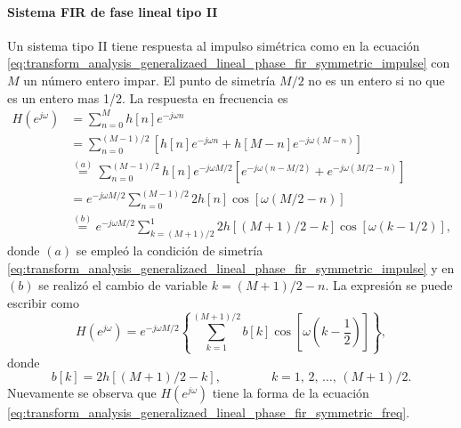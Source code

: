 \documentclass[a4paper]{report}
\begin{document}
\paragraph{Sistema FIR de fase lineal tipo II} Un sistema tipo II tiene respuesta al impulso simétrica como en la ecuación \ref{eq:transform_analysis_generalizaed_lineal_phase_fir_symmetric_impulse}
con \(M\) un número entero impar. El punto de simetría \(M/2\) no es un entero si no que es un entero mas 1/2. La respuesta en frecuencia es
\begin{align*}
 H(e^{j\omega})&=\sum_{n=0}^M h[n]e^{-j\omega n}\\
  &=\sum_{n=0}^{(M-1)/2}\left[h[n]e^{-j\omega n}+h[M-n]e^{-j\omega(M-n)}\right]\\
  &\overset{(a)}{=}\sum_{n=0}^{(M-1)/2}h[n]e^{-j\omega M/2}\left[e^{-j\omega(n-M/2)}+e^{-j\omega(M/2-n)}\right]\\
  &=e^{-j\omega M/2}\sum_{n=0}^{(M-1)/2}2h[n]\cos[\omega(M/2-n)]\\
  &\overset{(b)}{=}e^{-j\omega M/2}\sum_{k=(M+1)/2}^1 2h[(M+1)/2-k]\cos[\omega(k-1/2)],
\end{align*}
donde \((a)\) se empleó la condición de simetría \ref{eq:transform_analysis_generalizaed_lineal_phase_fir_symmetric_impulse} y en \((b)\) se realizó el cambio de variable \(k=(M+1)/2-n\). La expresión se puede escribir como
\begin{equation}\label{eq:transform_analysis_generalizaed_lineal_phase_fir_type_II_freq_resp}
 H(e^{j\omega})=e^{-j\omega M/2}\left\{\sum_{k=1}^{(M+1)/2}b[k]\cos\left[\omega\left(k-\frac{1}{2}\right)\right]\right\}, 
\end{equation}
donde
\[
 b[k]=2h[(M+1)/2-k],
 \qquad\qquad 
 k=1,\,2,\,\dots,\,(M+1)/2.
\]
Nuevamente se observa que \(H(e^{j\omega})\) tiene la forma de la ecuación \ref{eq:transform_analysis_generalizaed_lineal_phase_fir_symmetric_freq}.
\end{document}
